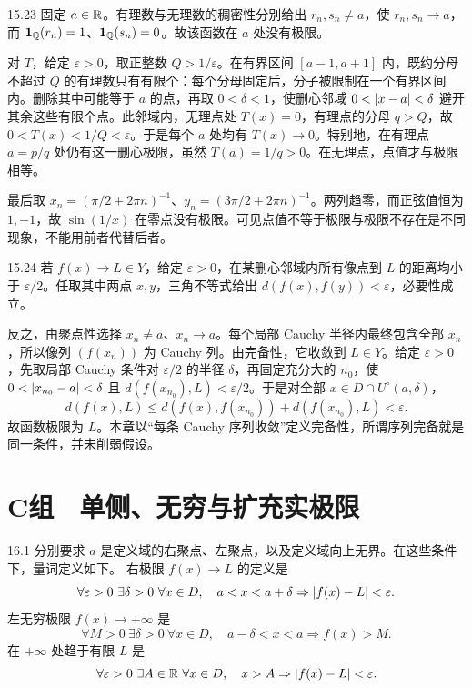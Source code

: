 \begin{solution}{15.23}
固定 \(a\in\mathbb{R}\)。有理数与无理数的稠密性分别给出 \(r_n,s_n\ne a\)，使 \(r_n,s_n\to a\)，而 \(\mathbf1_{\mathbb{Q}}(r_n)=1\)、\(\mathbf1_{\mathbb{Q}}(s_n)=0\)。故该函数在 \(a\) 处没有极限。

对 \(T\)，给定 \(\varepsilon>0\)，取正整数 \(Q>1/\varepsilon\)。在有界区间 \([a-1,a+1]\) 内，既约分母不超过 \(Q\) 的有理数只有有限个：每个分母固定后，分子被限制在一个有界区间内。删除其中可能等于 \(a\) 的点，再取 \(0<\delta<1\)，使删心邻域 \(0<\left|x-a\right|<\delta\) 避开其余这些有限个点。此邻域内，无理点处 \(T(x)=0\)，有理点的分母 \(q>Q\)，故 \(0<T(x)<1/Q<\varepsilon\)。于是每个 \(a\) 处均有 \(T(x)\to0\)。特别地，在有理点 \(a=p/q\) 处仍有这一删心极限，虽然 \(T(a)=1/q>0\)。在无理点，点值才与极限相等。

最后取 \(x_n=(\pi/2+2\pi n)^{-1}\)、\(y_n=(3\pi/2+2\pi n)^{-1}\)。两列趋零，而正弦值恒为 \(1,-1\)，故 \(\sin(1/x)\) 在零点没有极限。可见点值不等于极限与极限不存在是不同现象，不能用前者代替后者。
\end{solution}

\begin{solution}{15.24}
若 \(f(x)\to L\in Y\)，给定 \(\varepsilon>0\)，在某删心邻域内所有像点到 \(L\) 的距离均小于 \(\varepsilon/2\)。任取其中两点 \(x,y\)，三角不等式给出 \(d(f(x),f(y))<\varepsilon\)，必要性成立。

反之，由聚点性选择 \(x_n\ne a\)、\(x_n\to a\)。每个局部 Cauchy 半径内最终包含全部 \(x_n\)，所以像列 \((f(x_n))\) 为 Cauchy 列。由完备性，它收敛到 \(L\in Y\)。给定 \(\varepsilon>0\)，先取局部 Cauchy 条件对 \(\varepsilon/2\) 的半径 \(\delta\)，再固定充分大的 \(n_0\)，使 \(0<\left|x_{n_0}-a\right|<\delta\) 且 \(d(f(x_{n_0}),L)<\varepsilon/2\)。于是对全部 \(x\in D\cap U^\circ(a,\delta)\)，
\[
 d(f(x),L)\le d(f(x),f(x_{n_0}))+d(f(x_{n_0}),L)<\varepsilon.
\]
故函数极限为 \(L\)。本章以“每条 Cauchy 序列收敛”定义完备性，所谓序列完备就是同一条件，并未削弱假设。
\end{solution}

\section*{C组　单侧、无穷与扩充实极限}

\begin{solution}{16.1}
分别要求 \(a\) 是定义域的右聚点、左聚点，以及定义域向上无界。在这些条件下，量词定义如下。
右极限 \(f(x)\to L\) 的定义是
\[
 \forall\varepsilon>0\ \exists\delta>0\ \forall x\in D,\quad
 a<x<a+\delta\Rightarrow\abs{f(x)-L}<\varepsilon.
\]
左无穷极限 \(f(x)\to+\infty\) 是
\[
 \forall M>0\ \exists\delta>0\ \forall x\in D,\quad
 a-\delta<x<a\Rightarrow f(x)>M.
\]
在 \(+\infty\) 处趋于有限 \(L\) 是
\[
 \forall\varepsilon>0\ \exists A\in\R\ \forall x\in D,\quad
 x>A\Rightarrow\abs{f(x)-L}<\varepsilon.
\]
\end{solution}

